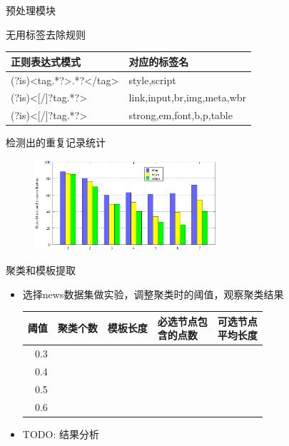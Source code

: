 \documentclass[presentation]{beamer}
\begin{document}
\begin{frame}[label=sec-3-3]{预处理模块}
\begin{block}{无用标签去除规则}
\begin{table}[hb]
  \centering
  \begin{tabular}{ll}
    \toprule
    正则表达式模式 & 对应的标签名 \\
    \hline
    (?is)<tag.*?>.*?</tag> & style,script \\
    (?is)<[/]?tag.*?> & link,input,br,img,meta,wbr \\
    (?is)<[/]?tag.*?> & strong,em,font,b,p,table \\
    \bottomrule
  \end{tabular}
\end{table}   
\end{block}

\begin{block}{检测出的重复记录统计}
\begin{figure}[hb]
  \centering
  \includegraphics[width=0.6\textwidth]{recordlength.png}
\end{figure}    
\end{block}
\end{frame}

\begin{frame}[label=sec-3-4]{聚类和模板提取}
\begin{itemize}
\item 选择news数据集做实验，调整聚类时的阈值，观察聚类结果
\begin{table}
  \centering
  \begin{tabular}{rllll}
    \toprule
    阈值 & 聚类个数 & 模板长度 & \pbox{2.5in}{必选节点包\\ 含的点数} & \pbox{2.5in}{可选节点\\ 平均长度} \\
    \hline
    0.3 &  &  &  &  \\
    0.4 &  &  &  &  \\
    0.5 &  &  &  &  \\
    0.6 &  &  &  &  
    \bottomrule
  \end{tabular}
\end{table}
\item TODO: 结果分析
\end{itemize}
\end{frame}
\end{document}

